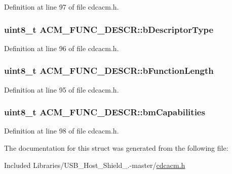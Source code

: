 \-Definition at line 97 of file cdcacm.\-h.

\hypertarget{struct_a_c_m___f_u_n_c___d_e_s_c_r_a4562e71852b142b483b68deaaa360e6a}{
\subsubsection[{b\-Descriptor\-Type}]{\setlength{\rightskip}{0pt plus 5cm}uint8\-\_\-t {\bf \-A\-C\-M\-\_\-\-F\-U\-N\-C\-\_\-\-D\-E\-S\-C\-R\-::b\-Descriptor\-Type}}}\label{struct_a_c_m___f_u_n_c___d_e_s_c_r_a4562e71852b142b483b68deaaa360e6a}


\-Definition at line 96 of file cdcacm.\-h.

\hypertarget{struct_a_c_m___f_u_n_c___d_e_s_c_r_a46c41dcbc0f3fdc37c0cd411b6b3213e}{
\subsubsection[{b\-Function\-Length}]{\setlength{\rightskip}{0pt plus 5cm}uint8\-\_\-t {\bf \-A\-C\-M\-\_\-\-F\-U\-N\-C\-\_\-\-D\-E\-S\-C\-R\-::b\-Function\-Length}}}\label{struct_a_c_m___f_u_n_c___d_e_s_c_r_a46c41dcbc0f3fdc37c0cd411b6b3213e}


\-Definition at line 95 of file cdcacm.\-h.

\hypertarget{struct_a_c_m___f_u_n_c___d_e_s_c_r_a6c54b317cabd68eebd318257ab02abe4}{
\subsubsection[{bm\-Capabilities}]{\setlength{\rightskip}{0pt plus 5cm}uint8\-\_\-t {\bf \-A\-C\-M\-\_\-\-F\-U\-N\-C\-\_\-\-D\-E\-S\-C\-R\-::bm\-Capabilities}}}\label{struct_a_c_m___f_u_n_c___d_e_s_c_r_a6c54b317cabd68eebd318257ab02abe4}


\-Definition at line 98 of file cdcacm.\-h.



\-The documentation for this struct was generated from the following file\-:\begin{DoxyCompactItemize}
\item 
\-Included Libraries/\-U\-S\-B\-\_\-\-Host\-\_\-\-Shield\-\_.-\/master/\hyperlink{cdcacm_8h}{cdcacm.\-h}\end{DoxyCompactItemize}
